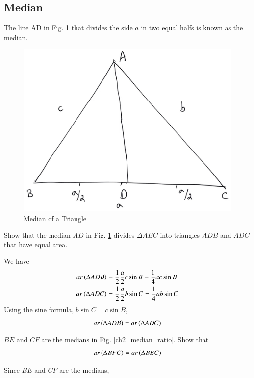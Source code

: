 \subsection{Median}
\begin{definition}
	The line AD in Fig. \ref{ch2_median_def} that divides the side $a$ in two equal halfs is known as the median.
\end{definition}
\begin{figure}[!h]
	\begin{center}
		
		\includegraphics[width=\columnwidth]{./figs/ch2_median_def}
		\vspace*{-10cm}
	\end{center}
	\caption{Median of a Triangle}
	\label{ch2_median_def}	
\end{figure}

\begin{problem}
	Show that the median $AD$ in Fig. \ref{ch2_median_def} divides  $\Delta ABC$ into triangles $ADB$ and $ADC$ that have equal area.
\end{problem}
\proof We have
%
\begin{align}
ar \left(\Delta ADB\right) &= \frac{1}{2}\frac{a}{2}c \sin B =  \frac{1}{4}ac \sin B \\
ar \left(\Delta ADC\right) &= \frac{1}{2}\frac{a}{2}b \sin C =  \frac{1}{4}ab \sin C 
\end{align}
%
Using the sine formula, $b \sin C = c \sin B$,
\begin{equation}
ar \left(\Delta ADB\right) = ar \left(\Delta ADC\right)
\end{equation}
\begin{problem}
	$BE$ and $CF$ are the medians in Fig. \ref{ch2_median_ratio}.  Show that
	\begin{equation}
	ar \left(\Delta BFC\right) = ar \left(\Delta BEC\right)
	\end{equation} 
	\label{ch2_median_eq_tri}
\end{problem}
\proof Since $BE$ and $CF$ are the medians, 

